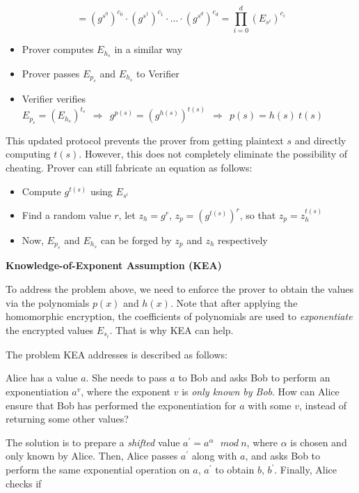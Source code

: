 \documentclass[
]{report}
\begin{document}
\[= \left( g^{s^{0}} \right)^{c_{0}} \cdot \left( g^{s^{1}} \right)^{c_{1}} \cdot \ldots \cdot \left( g^{s^{d}} \right)^{c_{d}} = \prod_{i = 0}^{d}\left( E_{s^{i}} \right)^{c_{i}}\]

\begin{itemize}
\item
  Prover computes \(E_{h_{s}}\) in a similar way
\item
  Prover passes \(E_{p_{s}}\) and \(E_{h_{s}}\) to Verifier
\item
  Verifier verifies
  \(E_{p_{s}} = \left( E_{h_{s}} \right)^{t_{s}}\mathbf{\ \  \Rightarrow \ \ }g^{p(s)} = \left( g^{h(s)} \right)^{t(s)}\mathbf{\ \  \Rightarrow \ \ }p(s) = h(s)\ t(s)\)
\end{itemize}

This updated protocol prevents the prover from getting plaintext \(s\)
and directly computing \(t(s)\). However, this does not completely
eliminate the possibility of cheating. Prover can still fabricate an
equation as follows:

\begin{itemize}
\item
  Compute \(g^{t(s)}\) using \(E_{s^{i}}\)
\item
  Find a random value \(r\), let \(z_{h} = g^{r}\),
  \(z_{p} = \left( g^{t(s)} \right)^{r}\), so that
  \(z_{p} = z_{h}^{t(s)}\)
\item
  Now, \(E_{p_{s}}\) and \(E_{h_{s}}\) can be forged by \(z_{p}\) and
  \(z_{h}\) respectively
\end{itemize}

\textbf{Knowledge-of-Exponent Assumption (KEA)}

To address the problem above, we need to enforce the prover to obtain
the values via the polynomials \(p(x)\) and \(h(x)\). Note that after
applying the homomorphic encryption, the coefficients of polynomials are
used to \emph{exponentiate} the encrypted values \(E_{s_{i}}\). That is
why KEA can help.

The problem KEA addresses is described as follows:

Alice has a value \(a\). She needs to pass \(a\) to Bob and asks Bob to
perform an exponentiation \(a^{v}\), where the exponent \(v\) is
\emph{only known by Bob}. How can Alice ensure that Bob has performed
the exponentiation for \(a\) with some \(v\), instead of returning some
other values?

The solution is to prepare a \emph{shifted} value
\(a^{'} = a^{\alpha}\ \ \ mod\ n\), where \(\alpha\) is chosen and only
known by Alice. Then, Alice passes \(a^{'}\) along with \(a\), and asks
Bob to perform the same exponential operation on \(a\), \(a^{'}\) to
obtain \(b\), \(b^{'}\). Finally, Alice checks if
\end{document}
